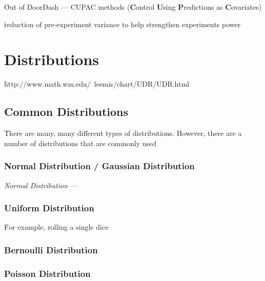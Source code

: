 \r{Out of DoorDash --- CUPAC methods (\textbf{C}ontrol \textbf{U}sing \textbf{P}redictions as \textbf{C}ovariates)\cite{tangcontrol}}

\r{reduction of pre-experiment variance to help strengthen experiments power}


\section{Distributions}

\r{http://www.math.wm.edu/~leemis/chart/UDR/UDR.html}


\subsection{Common Distributions}

\r{There are many, many different types of distributions. However, there are a number of distributions that are commonly used}

\subsubsection{Normal Distribution / Gaussian Distribution}

\emph{Normal Distribution} --- 

\subsubsection{Uniform Distribution}


\r{For example, rolling a single dice}

\subsubsection{Bernoulli Distribution}


\subsubsection{Poisson Distribution}

